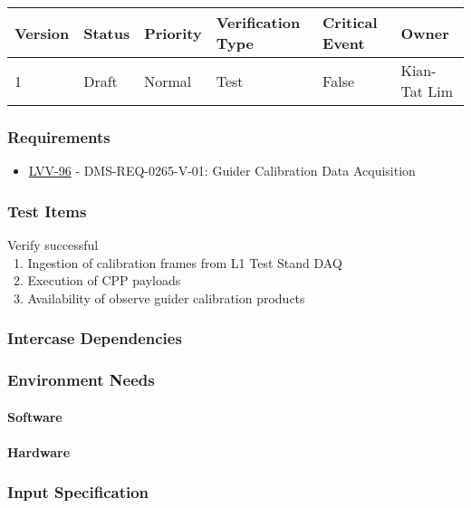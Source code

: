 \begin{longtable}[]{llllll}
\toprule
Version & Status & Priority & Verification Type & Critical Event & Owner
\\\midrule
1 & Draft & Normal &
Test & False & Kian-Tat Lim
\\\bottomrule
\end{longtable}

\subsubsection{Requirements}
\begin{itemize}
\item \href{https://jira.lsstcorp.org/browse/LVV-96}{LVV-96} - DMS-REQ-0265-V-01: Guider Calibration Data Acquisition
\end{itemize}

\subsubsection{Test Items}
{Verify successful}\\
{~1. Ingestion of calibration frames from L1 Test Stand DAQ}\\
{~2. Execution of CPP payloads}\\
{~3. Availability of observe guider calibration products}



\subsubsection{Intercase Dependencies}

\subsubsection{Environment Needs}

\paragraph{Software}

\paragraph{Hardware}

\subsubsection{Input Specification}

